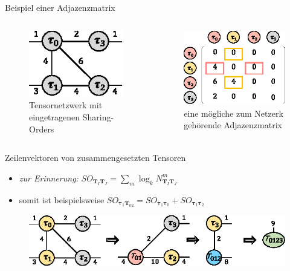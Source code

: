\documentclass{beamer}
\begin{document}
\begin{frame}{Beispiel einer Adjazenzmatrix}
	\begin{columns}
		\begin{figure}
			\includegraphics[scale=1.7]{figure_03_a_mid}
			\caption*{Tensornetzwerk mit eingetragenen Sharing-Orders}
		\end{figure}
		\begin{figure}
			\includegraphics[scale=1.3]{figure_05_c}
			\caption*{eine mögliche zum Netzerk gehörende Adjazenzmatrix}
		\end{figure}
	\end{columns}
\end{frame}

\begin{frame}{Zeilenvektoren von zusammengesetzten Tensoren}
	\begin{itemize}
		\item \textit{zur Erinnerung:} $SO_{\bm{T}_I \bm{T}_J} = \sum_m \log_k N^m_{\bm{T}_I \bm{T}_J}$
		\item somit ist beispielsweise $SO_{\bm{\tau}_1 \bm{T}_{02}} = SO_{\bm{\tau}_1 \bm{\tau}_0} + SO_{\bm{\tau}_1 \bm{\tau}_2}$
	\end{itemize} \pause

	\begin{figure}
		\includegraphics{figure_03_b_low}
	\end{figure}
\end{frame}
\end{document}
